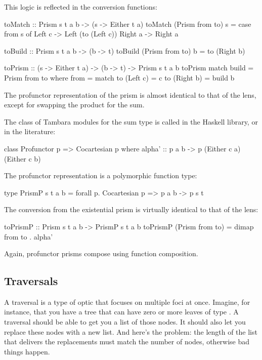 \documentclass[DaoFP]{subfiles}
\begin{document}
This logic is reflected in the conversion functions:
\begin{haskell}
toMatch :: Prism s t a b -> (s -> Either t a)
toMatch (Prism from to) s =
  case from s of
    Left  c -> Left (to (Left c))
    Right a -> Right a
\end{haskell}

\begin{haskell}
toBuild :: Prism s t a b -> (b -> t)
toBuild (Prism from to) b = to (Right b)
\end{haskell}

\begin{haskell}
toPrism :: (s -> Either t a) -> (b -> t) -> Prism s t a b
toPrism match build = Prism from to
  where
    from = match
    to (Left  c) = c
    to (Right b) = build b
\end{haskell}

The profunctor representation of the prism is almost identical to that of the lens, except for swapping the product for the sum. 

The class of Tambara modules for the sum type is called  in the Haskell library, or  in the literature:
\begin{haskell}
class Profunctor p => Cocartesian p where
  alpha' :: p a b -> p (Either c a) (Either c b)
\end{haskell}
The profunctor representation is a polymorphic function type:
\begin{haskell}
type PrismP s t a b = forall p. Cocartesian p => p a b -> p s t
\end{haskell}

The conversion from the existential prism is virtually identical to that of the lens:
\begin{haskell}
toPrismP :: Prism s t a b -> PrismP s t a b
toPrismP (Prism from to) = dimap from to . alpha'
\end{haskell}

Again, profunctor prisms compose using function composition.
\subsection{Traversals}
A traversal is a type of optic that focuses on multiple foci at once. Imagine, for instance, that you have a tree that can have zero or more leaves of type . A traversal should be able to get you a list of those nodes. It should also let you replace these nodes with a new list. And here's the problem: the length of the list that delivers the replacements must match the number of nodes, otherwise bad things happen. 
\end{document}
